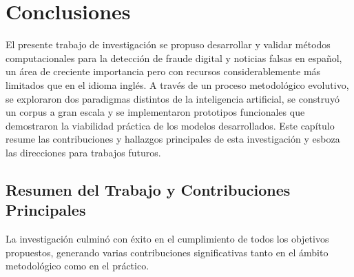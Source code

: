 \chapter{Conclusiones}
\label{cap:Conclusiones}

El presente trabajo de investigación se propuso desarrollar y validar métodos computacionales para la detección de fraude digital y noticias falsas en español, un área de creciente importancia pero con recursos considerablemente más limitados que en el idioma inglés. A través de un proceso metodológico evolutivo, se exploraron dos paradigmas distintos de la inteligencia artificial, se construyó un corpus a gran escala y se implementaron prototipos funcionales que demostraron la viabilidad práctica de los modelos desarrollados. Este capítulo resume las contribuciones y hallazgos principales de esta investigación y esboza las direcciones para trabajos futuros.

\section{Resumen del Trabajo y Contribuciones Principales}
La investigación culminó con éxito en el cumplimiento de todos los objetivos propuestos, generando varias contribuciones significativas tanto en el ámbito metodológico como en el práctico.

